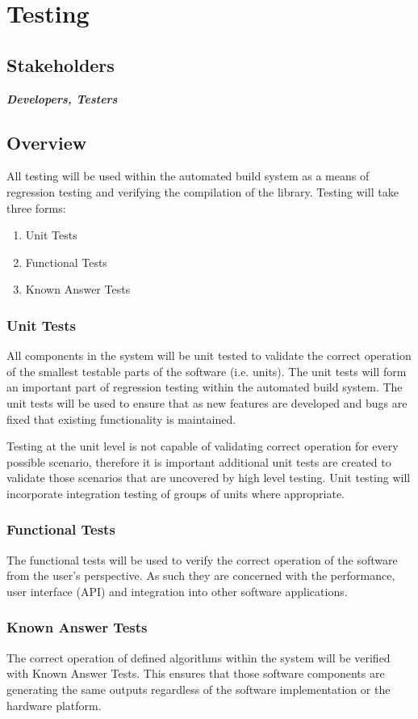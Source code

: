 \chapter{Testing}
\label{ch_testing}


\section{Stakeholders}

\textbf{\textit{Developers, Testers}}


\section{Overview}

All testing will be used within the automated build system as a means of regression testing and verifying the compilation of the library. Testing will take three forms:

\begin{enumerate}
  \item Unit Tests
  \item Functional Tests
  \item Known Answer Tests
\end{enumerate}

\subsection{Unit Tests}

All components in the system will be unit tested to validate the correct operation of the smallest testable parts of the software (i.e. units). The unit tests will form an important part of regression testing within the automated build system. The unit tests will be used to ensure that as new features are developed and bugs are fixed that existing functionality is maintained.

Testing at the unit level is not capable of validating correct operation for every possible scenario, therefore it is important additional unit tests are created to validate those scenarios that are uncovered by high level testing. Unit testing will incorporate integration testing of groups of units where appropriate.

\subsection{Functional Tests}

The functional tests will be used to verify the correct operation of the software from the user's perspective. As such they are concerned with the performance, user interface (API) and integration into other software applications.

\subsection{Known Answer Tests}

The correct operation of defined algorithms within the system will be verified with Known Answer Tests. This ensures that those software components are generating the same outputs regardless of the software implementation or the hardware platform.

